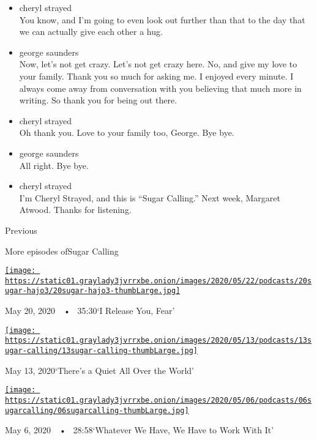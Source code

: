 \begin{itemize}
\item
  cheryl strayed\\
  You know, and I'm going to even look out further than that to the day
  that we can actually give each other a hug.
\item
  george saunders\\
  Now, let's not get crazy. Let's not get crazy here. No, and give my
  love to your family. Thank you so much for asking me. I enjoyed every
  minute. I always come away from conversation with you believing that
  much more in writing. So thank you for being out there.
\item
  cheryl strayed\\
  Oh thank you. Love to your family too, George. Bye bye.
\item
  george saunders\\
  All right. Bye bye.
\item
  cheryl strayed\\
  I'm Cheryl Strayed, and this is ``Sugar Calling.'' Next week, Margaret
  Atwood. Thanks for listening.
\end{itemize}

Previous

More episodes ofSugar Calling

\href{https://www.nytimes3xbfgragh.onion/2020/05/20/podcasts/sugar-calling-joy-harjo-poetry-virus.html?action=click\&module=audio-series-bar\&region=header\&pgtype=Article}{\texttt{[image: https://static01.graylady3jvrrxbe.onion/images/2020/05/22/podcasts/20sugar-hajo3/20sugar-hajo3-thumbLarge.jpg]}}

May 20, 2020~~•~ 35:30`I Release You, Fear'

\href{https://www.nytimes3xbfgragh.onion/2020/05/13/podcasts/sugar-calling-billy-collins-poetry-virus.html?action=click\&module=audio-series-bar\&region=header\&pgtype=Article}{\texttt{[image: https://static01.graylady3jvrrxbe.onion/images/2020/05/13/podcasts/13sugar-calling/13sugar-calling-thumbLarge.jpg]}}

May 13, 2020`There's a Quiet All Over the World'

\href{https://www.nytimes3xbfgragh.onion/2020/05/06/podcasts/sugar-calling-alice-walker-quarantine-virus.html?action=click\&module=audio-series-bar\&region=header\&pgtype=Article}{\texttt{[image: https://static01.graylady3jvrrxbe.onion/images/2020/05/06/podcasts/06sugarcalling/06sugarcalling-thumbLarge.jpg]}}

May 6, 2020~~•~ 28:58`Whatever We Have, We Have to Work With It'

